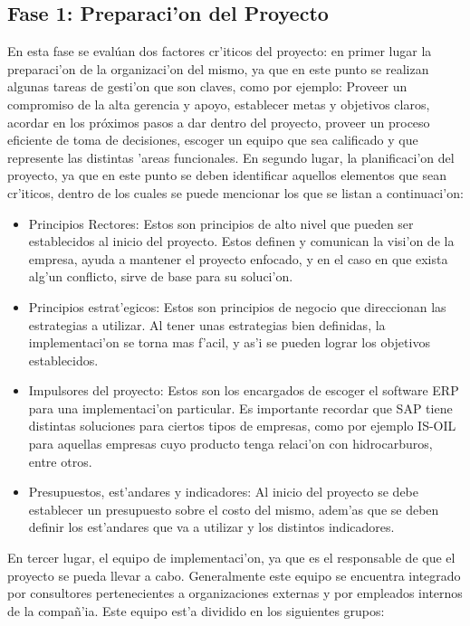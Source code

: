 \subsection{Fase 1: Preparaci'on del Proyecto}
\indent En esta fase se evalúan dos factores cr'iticos del proyecto: en primer lugar la preparaci'on de la organizaci'on del mismo, ya que en este punto se realizan algunas tareas de gesti'on que son claves, como por ejemplo: Proveer un compromiso de la alta gerencia y apoyo, establecer metas y objetivos claros, acordar en los próximos pasos a dar dentro del proyecto, proveer un proceso eficiente de toma de decisiones, escoger un equipo que sea calificado y que represente las distintas 'areas funcionales.
\newline
\newline
\indent En segundo lugar, la planificaci'on del proyecto, ya que en este punto se deben identificar aquellos elementos que sean cr'iticos, dentro de los cuales se puede mencionar los que se listan a continuaci'on:
\begin{itemize}
\item Principios Rectores: Estos son principios de alto nivel que pueden ser establecidos al inicio del proyecto. Estos definen y comunican la visi'on de la empresa, ayuda a mantener el proyecto enfocado, y en el caso en que exista alg'un conflicto, sirve de base para su soluci'on. 
\item Principios estrat'egicos:  Estos son principios de negocio que direccionan las estrategias a utilizar. Al tener unas estrategias bien definidas, la implementaci'on se torna mas f'acil, y as'i se pueden lograr los objetivos establecidos.
\item Impulsores del proyecto: Estos son los encargados de escoger el software ERP para una implementaci'on particular. Es importante recordar que SAP tiene distintas soluciones para ciertos tipos de empresas, como por ejemplo IS-OIL para aquellas empresas cuyo producto tenga relaci'on con hidrocarburos, entre otros. 
\item Presupuestos, est'andares y indicadores: Al inicio del proyecto se debe establecer un presupuesto sobre el costo del mismo, adem'as que se deben definir los est'andares que va a utilizar y los distintos indicadores.
\end{itemize}
En tercer lugar, el equipo de implementaci'on, ya que es el responsable de que el proyecto se pueda llevar a cabo. Generalmente este equipo se encuentra integrado por consultores pertenecientes a organizaciones externas y por empleados internos de la compa\~n'ia. Este equipo est'a dividido en los siguientes grupos:
